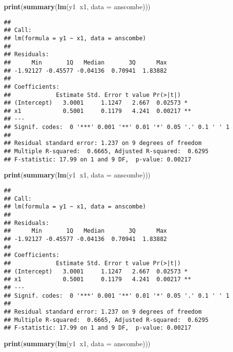 \documentclass[]{book}
\newenvironment{Shaded}{\begin{snugshade}}{\end{snugshade}}
\newcommand{\KeywordTok}[1]{\textcolor[rgb]{0.13,0.29,0.53}{\textbf{#1}}}
\newcommand{\DataTypeTok}[1]{\textcolor[rgb]{0.13,0.29,0.53}{#1}}
\newcommand{\OperatorTok}[1]{\textcolor[rgb]{0.81,0.36,0.00}{\textbf{#1}}}
\newcommand{\NormalTok}[1]{#1}
\theoremstyle{definition}
\theoremstyle{definition}
\theoremstyle{definition}
\theoremstyle{remark}
\begin{document}
\begin{Shaded}
\begin{Highlighting}[]
\KeywordTok{print}\NormalTok{(}\KeywordTok{summary}\NormalTok{(}\KeywordTok{lm}\NormalTok{(y1}\OperatorTok{~}\NormalTok{x1, }\DataTypeTok{data =}\NormalTok{ anscombe)))}
\end{Highlighting}
\end{Shaded}

\begin{verbatim}
## 
## Call:
## lm(formula = y1 ~ x1, data = anscombe)
## 
## Residuals:
##      Min       1Q   Median       3Q      Max 
## -1.92127 -0.45577 -0.04136  0.70941  1.83882 
## 
## Coefficients:
##             Estimate Std. Error t value Pr(>|t|)   
## (Intercept)   3.0001     1.1247   2.667  0.02573 * 
## x1            0.5001     0.1179   4.241  0.00217 **
## ---
## Signif. codes:  0 '***' 0.001 '**' 0.01 '*' 0.05 '.' 0.1 ' ' 1
## 
## Residual standard error: 1.237 on 9 degrees of freedom
## Multiple R-squared:  0.6665, Adjusted R-squared:  0.6295 
## F-statistic: 17.99 on 1 and 9 DF,  p-value: 0.00217
\end{verbatim}

\begin{Shaded}
\begin{Highlighting}[]
\KeywordTok{print}\NormalTok{(}\KeywordTok{summary}\NormalTok{(}\KeywordTok{lm}\NormalTok{(y1}\OperatorTok{~}\NormalTok{x1, }\DataTypeTok{data =}\NormalTok{ anscombe)))}
\end{Highlighting}
\end{Shaded}

\begin{verbatim}
## 
## Call:
## lm(formula = y1 ~ x1, data = anscombe)
## 
## Residuals:
##      Min       1Q   Median       3Q      Max 
## -1.92127 -0.45577 -0.04136  0.70941  1.83882 
## 
## Coefficients:
##             Estimate Std. Error t value Pr(>|t|)   
## (Intercept)   3.0001     1.1247   2.667  0.02573 * 
## x1            0.5001     0.1179   4.241  0.00217 **
## ---
## Signif. codes:  0 '***' 0.001 '**' 0.01 '*' 0.05 '.' 0.1 ' ' 1
## 
## Residual standard error: 1.237 on 9 degrees of freedom
## Multiple R-squared:  0.6665, Adjusted R-squared:  0.6295 
## F-statistic: 17.99 on 1 and 9 DF,  p-value: 0.00217
\end{verbatim}

\begin{Shaded}
\begin{Highlighting}[]
\KeywordTok{print}\NormalTok{(}\KeywordTok{summary}\NormalTok{(}\KeywordTok{lm}\NormalTok{(y1}\OperatorTok{~}\NormalTok{x1, }\DataTypeTok{data =}\NormalTok{ anscombe)))}
\end{Highlighting}
\end{Shaded}
\end{document}

